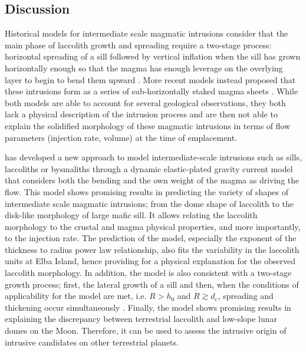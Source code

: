 \subsection{Discussion}
\label{C2-sec:discussion-1}

Historical models for intermediate  scale magmatic intrusions consider
that  the main  phase  of  laccolith growth  and  spreading require  a
two-stage process: horizontal spreading of a sill followed by vertical
inflation  when the  sill has  grown horizontally  enough so  that the
magma has enough leverage on the overlying layer to begin to bend them
upward \citep{Johnson:1973ho,Koch:1981if}.  More recent models instead
proposed that  these intrusions form  as a series  of sub-horizontally
staked magma  sheets \citep{Morgan:2008hj,Menand:2011ki}.   While both
models are able  to account for several  geological observations, they
both lack a physical description of the intrusion process and are then
not  able  to explain  the  solidified  morphology of  these  magmatic
intrusions in terms of flow parameters (injection rate, volume) at the
time of emplacement.

\citet{Michaut:2011kg}  has   developed  a   new  approach   to  model
intermediate-scale intrusions such as  sills, laccoliths or bysmaliths
through a dynamic elastic-plated  gravity current model that considers
both the bending and the own weight  of the magma as driving the flow.
This model shows promising results in predicting the variety of shapes
of  intermediate scale  magmatic intrusions;  from the  dome shape  of
laccolith to the disk-like morphology  of large mafic sill.  It allows
relating the  laccolith morphology to the crustal  and magma physical
properties,  and  more  importantly,   to  the  injection  rate.   The
prediction of the  model, especially the exponent of  the thickness to
radius  power  law relationship,  also  fits  the variability  in  the
laccolith  units  at  Elba  Island, hence  providing  for  a  physical
explanation for  the observed laccolith morphology.   In addition, the
model is also  consistent with a two-stage growth  process; first, the
lateral  growth   of  a  sill   and  then,  when  the   conditions  of
applicability   for   the   model   are   met,   i.e.    $R>h_0$   and
$R  \gtrsim  d_c$,  spreading   and  thickening  occur  simultaneously
\citep{Michaut:2011kg}. Finally, the model  shows promising results in
explaining the discrepancy between terrestrial laccolith and low-slope
lunar domes  on the  Moon.  Therefore,  it can be  used to  assess the
intrusive origin of intrusive candidates on other terrestrial planets.

